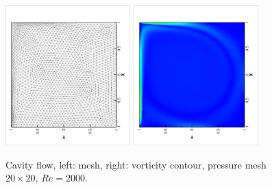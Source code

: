 \documentclass{eajam}
\begin{document}
       \begin{figure}[!htbp]
         \begin{center}
             \includegraphics[width = 0.43\textwidth, angle = -90]{picture/cavity_flow_data/moving_mesh_20.eps}
             \includegraphics[width = 0.43\textwidth, angle = -90]{picture/cavity_flow_data/vortex_mesh20.eps}
        \end{center}
        \caption{\small Cavity flow, left: mesh, right: vorticity
          contour, pressure mesh $20 \times 20$, $Re = 2000$.}
        \label{fig::cavity_flow_mesh}
       \end{figure}
\end{document}
